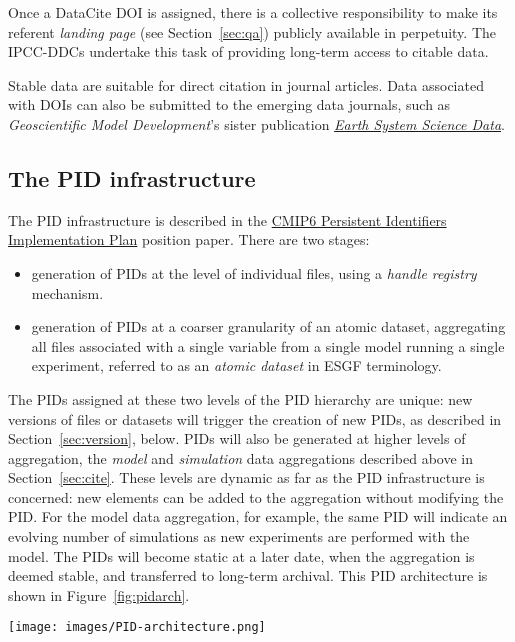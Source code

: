 \documentclass[gmd,manuscript]{copernicus}
\newcommand{\figref}[1] {\mbox{Figure   \ref{fig:#1}}}
\newcommand{\secref}[1] {\mbox{Section  \ref{sec:#1}}}
\begin{document}
\begin{itemize}
  Once a DataCite DOI is assigned, there is a collective
  responsibility to make its referent \emph{landing page} (see
  \secref{qa}) publicly available in perpetuity. The IPCC-DDCs
  undertake this task of providing long-term access to citable data.

  Stable data are suitable for direct citation in journal articles.
  Data associated with DOIs can also be submitted to the emerging data
  journals, such as \emph{Geoscientific Model Development}'s sister
  publication
  \href{https://www.earth-system-science-data.net/}{\emph{Earth System
      Science Data}}.
\end{itemize}

\subsection{The PID infrastructure}
\label{sec:pid}

The PID infrastructure is described in the
\href{https://goo.gl/dQAEDy}{CMIP6 Persistent Identifiers
  Implementation Plan} position paper. There are two stages:

\begin{itemize}
\item generation of PIDs at the level of individual files, using a
  \emph{handle registry} mechanism.
\item generation of PIDs at a coarser granularity of an atomic
  dataset, aggregating all files associated with a single variable
  from a single model running a single experiment, referred to as an
  \emph{atomic dataset} in ESGF terminology.
\end{itemize}

The PIDs assigned at these two levels of the PID hierarchy are unique:
new versions of files or datasets will trigger the creation of new
PIDs, as described in \secref{version}, below. PIDs will also be
generated at higher levels of aggregation, the \emph{model} and
\emph{simulation} data aggregations described above in \secref{cite}.
These levels are dynamic as far as the PID infrastructure is
concerned: new elements can be added to
the aggregation without modifying the PID. For the model data aggregation, 
for example, the same PID will indicate an evolving number of simulations as new
experiments are performed with the model.  The PIDs will become static at
a later date, when the aggregation is deemed stable, and transferred
to long-term archival. This PID architecture is shown in
\figref{pidarch}.


\begin{figure*}
  \begin{center}
    \texttt{[image: images/PID-architecture.png]}
  \end{center}
  \caption{PID architecture, showing layers in the PID hierarchy. In
    the lower layers of the hierarchy, PIDs are static once generated,
    and new datasets generate new versions with new PIDs. Figure
    courtesy Tobias Weigel.}
  \label{fig:pidarch}
\end{figure*}
\end{document}
